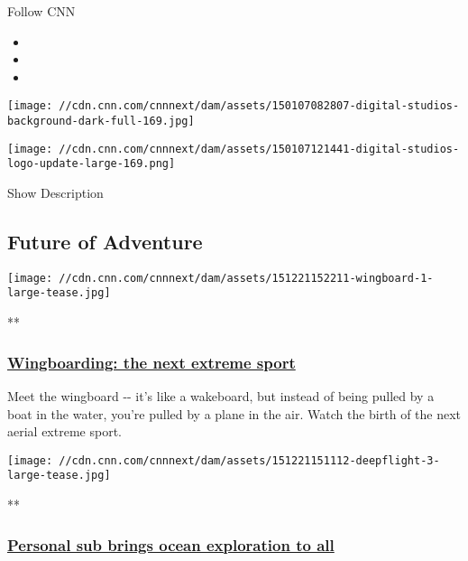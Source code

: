 Follow CNN

\begin{itemize}
\item
\item
\item
\end{itemize}

\texttt{[image: //cdn.cnn.com/cnnnext/dam/assets/150107082807-digital-studios-background-dark-full-169.jpg]}

\texttt{[image: //cdn.cnn.com/cnnnext/dam/assets/150107121441-digital-studios-logo-update-large-169.png]}

Show Description

\hypertarget{future-of-adventure}{%
\subsection{Future of Adventure}\label{future-of-adventure}}

\href{/videos/us/2015/12/21/orig-wingboard-airplane-extreme-sport-future-of-adventure.cnn}{}

\texttt{[image: //cdn.cnn.com/cnnnext/dam/assets/151221152211-wingboard-1-large-tease.jpg]}

**

\hypertarget{wingboarding-the-next-extreme-sport}{%
\subsubsection{\texorpdfstring{\href{/videos/us/2015/12/21/orig-wingboard-airplane-extreme-sport-future-of-adventure.cnn}{Wingboarding:
the next extreme
sport}}{Wingboarding: the next extreme sport}}\label{wingboarding-the-next-extreme-sport}}

Meet the wingboard -\/- it's like a wakeboard, but instead of being
pulled by a boat in the water, you're pulled by a plane in the air.
Watch the birth of the next aerial extreme sport.

\href{/videos/us/2015/12/21/orig-deepflight-personal-submarine-graham-hawkes-future-of-adventure.cnn}{}

\texttt{[image: //cdn.cnn.com/cnnnext/dam/assets/151221151112-deepflight-3-large-tease.jpg]}

**

\hypertarget{personal-sub-brings-ocean-exploration-to-all}{%
\subsubsection{\texorpdfstring{\href{/videos/us/2015/12/21/orig-deepflight-personal-submarine-graham-hawkes-future-of-adventure.cnn}{Personal
sub brings ocean exploration to
all}}{Personal sub brings ocean exploration to all}}\label{personal-sub-brings-ocean-exploration-to-all}}

